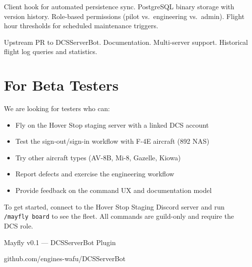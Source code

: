 \documentclass[10pt,a4paper,twocolumn]{article}
\begin{document}
\begin{description}[style=nextline,leftmargin=0.5em]
    \item[Beta] Client hook for automated persistence sync. PostgreSQL binary storage with version history. Role-based permissions (pilot vs.\ engineering vs.\ admin). Flight hour thresholds for scheduled maintenance triggers.
    \item[Release] Upstream PR to DCSServerBot. Documentation. Multi-server support. Historical flight log queries and statistics.
\end{description}

\section{For Beta Testers}

We are looking for testers who can:

\begin{itemize}
    \item Fly on the Hover Stop staging server with a linked DCS account
    \item Test the sign-out/sign-in workflow with F-4E aircraft (892 NAS)
    \item Try other aircraft types (AV-8B, Mi-8, Gazelle, Kiowa)
    \item Report defects and exercise the engineering workflow
    \item Provide feedback on the command UX and documentation model
\end{itemize}

To get started, connect to the Hover Stop Staging Discord server and run \texttt{/mayfly board} to see the fleet. All commands are guild-only and require the DCS role.

\vspace{1em}
\begin{center}
\small\textcolor{jswgrey}{Mayfly v0.1 --- DCSServerBot Plugin}

\textcolor{jswgrey}{github.com/engines-wafu/DCSServerBot}
\end{center}
\end{document}
